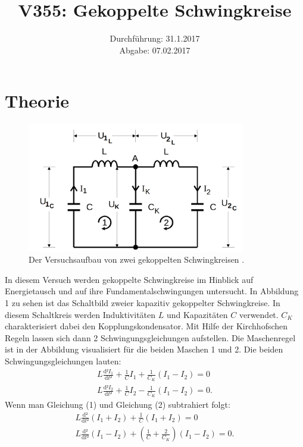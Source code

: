 \documentclass[
  bibliography=totoc,     %
  captions=tableheading,  %
  titlepage=firstiscover, %
]{scrartcl}
\title{V355: Gekoppelte Schwingkreise}
\author{
  Simon Schulte
  \texorpdfstring{
    \\
    \href{mailto:simon.schulte@udo.edu}{simon.schulte@udo.edu}
  }{}
  \texorpdfstring{\and}{, }
  Tim Sedlaczek
  \texorpdfstring{
    \\
    \href{mailto:tim.sedlaczek@udo.edu}{tim.sedlaczek@udo.edu}
  }{}
}
\date{Durchführung: 31.1.2017\\
      Abgabe: 07.02.2017}
\begin{document}
\maketitle
\thispagestyle{empty}
\tableofcontents
\newpage
\section{Theorie}
\label{sec:theorie}
\begin{figure}[htb]
  \centering
  \includegraphics[width=0.85\textwidth]{V3551.png}
  \caption{Der Versuchsaufbau von zwei gekoppelten Schwingkreisen \cite{anleitung}.}
  \label{fig:V3551}
\end{figure}
In diesem Versuch werden gekoppelte Schwingkreise im Hinblick auf Energietausch
und auf ihre Fundamentalschwingungen untersucht. In Abbildung 1 zu sehen ist
das Schaltbild zweier kapazitiv gekoppelter Schwingkreise. In diesem Schaltkreis
werden Induktivitäten $L$ und Kapazitäten $C$ verwendet. $C_K$ charakterisiert
dabei den Kopplungskondensator. Mit Hilfe der Kirchhofschen Regeln lassen
sich dann 2 Schwingungsgleichungen aufstellen. Die Maschenregel ist in der
Abbildung visualisiert für die beiden Maschen 1 und 2. Die beiden
Schwingungsgleichungen lauten:
\begin{align}
  L\frac{\mathup{d}²I_1}{\mathup{d}t²}+\frac{1}{C}I_1+\frac{1}{C_K}(I_1-I_2)=0 \\
  L\frac{\mathup{d}²I_2}{\mathup{d}t²}+\frac{1}{C}I_2-\frac{1}{C_K}(I_1-I_2)=0.
  \label{eqn:schwingungsgleichungen}
\end{align}
Wenn man Gleichung (1) und Gleichung (2) subtrahiert folgt:
\begin{align}
  L\frac{\mathup{d}²}{\mathup{d}t²}(I_1+I_2)+\frac{1}{C}(I_1+I_2)=0 \\
  L\frac{\mathup{d}²}{\mathup{d}t²}(I_1-I_2)+(\frac{1}{C}+\frac{2}{C_K})(I_1-I_2)=0.
\end{align}
\end{document}
